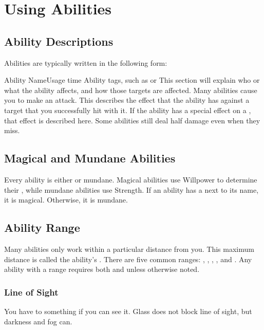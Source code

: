 \section{Using Abilities}\label{Using Abilities}

  \subsection{Ability Descriptions}
    Abilities are typically written in the following form:
    \begin{activeability}{Ability Name}{Usage time}
      \abilitytags Ability tags, such as \atAttune or \atFire
      \rankline
      This section will explain who or what the ability affects, and how those targets are affected.
      Many abilities cause you to make an attack.
      \hit This describes the effect that the ability has against a target that you successfully hit with it.
      \crit If the ability has a special effect on a , that effect is described here.
      \miss Some abilities still deal half damage even when they miss.
    \end{activeability}

  \subsection{Magical and Mundane Abilities}\label{Magical and Mundane Abilities}
    Every ability is either \magical or mundane.
    Magical abilities use Willpower to determine their , while mundane abilities use Strength.
    If an ability has a \sparkle{} next to its name, it is magical.
    Otherwise, it is mundane.

  \subsection{Ability Range}\label{Ability Range}
    Many abilities only work within a particular distance from you.
    This maximum distance is called the ability's .
    There are five common ranges: \shortrange, \medrange, \longrange, \distrange, and \extrange.
    Any ability with a range requires both  and  unless otherwise noted.

  \subsubsection{Line of Sight}
    You have  to something if you can see it.
    Glass does not block line of sight, but darkness and fog can.

